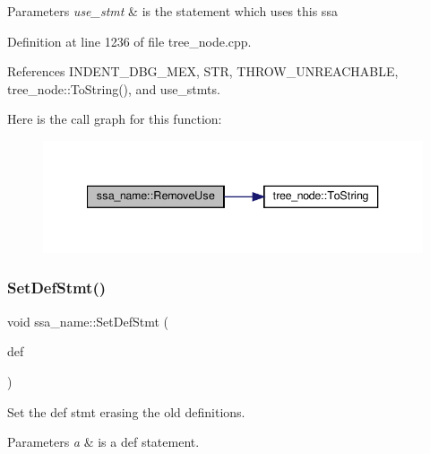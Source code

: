 \begin{DoxyParams}{Parameters}
{\em use\+\_\+stmt} & is the statement which uses this ssa \\
\hline
\end{DoxyParams}


Definition at line 1236 of file tree\+\_\+node.\+cpp.



References I\+N\+D\+E\+N\+T\+\_\+\+D\+B\+G\+\_\+\+M\+EX, S\+TR, T\+H\+R\+O\+W\+\_\+\+U\+N\+R\+E\+A\+C\+H\+A\+B\+LE, tree\+\_\+node\+::\+To\+String(), and use\+\_\+stmts.

Here is the call graph for this function\+:
\nopagebreak
\begin{figure}[H]
\begin{center}
\leavevmode
\includegraphics[width=340pt]{db/d2f/structssa__name_a7868a4cb68f715b32df67f1217865470_cgraph}
\end{center}
\end{figure}
\mbox{\label{structssa__name_a62b25db42763bfdd380ff6a87a02c7ad}} 
\subsubsection{\texorpdfstring{Set\+Def\+Stmt()}{SetDefStmt()}}
{\footnotesize\ttfamily void ssa\+\_\+name\+::\+Set\+Def\+Stmt (\begin{DoxyParamCaption}\item[{const \hyperlink{tree__node_8hpp_a6ee377554d1c4871ad66a337eaa67fd5}{tree\+\_\+node\+Ref} \&}]{def }\end{DoxyParamCaption})}



Set the def stmt erasing the old definitions. 


\begin{DoxyParams}{Parameters}
{\em a} & is a def statement. \\
\hline
\end{DoxyParams}


